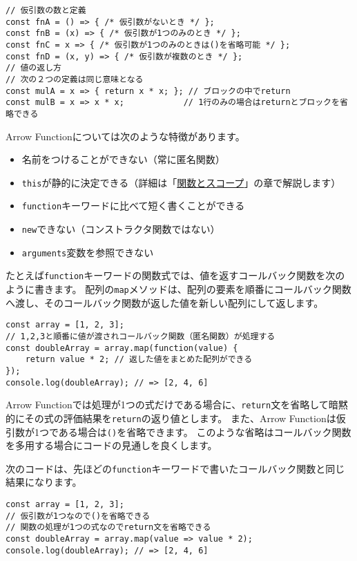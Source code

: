 \begin{lstlisting}
// 仮引数の数と定義
const fnA = () => { /* 仮引数がないとき */ };
const fnB = (x) => { /* 仮引数が1つのみのとき */ };
const fnC = x => { /* 仮引数が1つのみのときは()を省略可能 */ };
const fnD = (x, y) => { /* 仮引数が複数のとき */ };
// 値の返し方
// 次の２つの定義は同じ意味となる
const mulA = x => { return x * x; }; // ブロックの中でreturn
const mulB = x => x * x;            // 1行のみの場合はreturnとブロックを省略できる
\end{lstlisting}

Arrow Functionについては次のような特徴があります。

\begin{itemize}
\item
  名前をつけることができない（常に匿名関数）
\item
  \texttt{this}が静的に決定できる（詳細は「\hyperlink{function-and-scope}{関数とスコープ}」の章で解説します）
\item
  \texttt{function}キーワードに比べて短く書くことができる
\item
  \texttt{new}できない（コンストラクタ関数ではない）
\item
  \texttt{arguments}変数を参照できない
\end{itemize}

たとえば\texttt{function}キーワードの関数式では、値を返すコールバック関数を次のように書きます。
配列の\texttt{map}メソッドは、配列の要素を順番にコールバック関数へ渡し、そのコールバック関数が返した値を新しい配列にして返します。

\begin{lstlisting}
const array = [1, 2, 3];
// 1,2,3と順番に値が渡されコールバック関数（匿名関数）が処理する
const doubleArray = array.map(function(value) {
    return value * 2; // 返した値をまとめた配列ができる
});
console.log(doubleArray); // => [2, 4, 6]
\end{lstlisting}

Arrow
Functionでは処理が1つの式だけである場合に、\texttt{return}文を省略して暗黙的にその式の評価結果を\texttt{return}の返り値とします。
また、Arrow
Functionは仮引数が1つである場合は\texttt{()}を省略できます。
このような省略はコールバック関数を多用する場合にコードの見通しを良くします。

次のコードは、先ほどの\texttt{function}キーワードで書いたコールバック関数と同じ結果になります。

\begin{lstlisting}
const array = [1, 2, 3];
// 仮引数が1つなので()を省略できる
// 関数の処理が1つの式なのでreturn文を省略できる
const doubleArray = array.map(value => value * 2);
console.log(doubleArray); // => [2, 4, 6]
\end{lstlisting}

